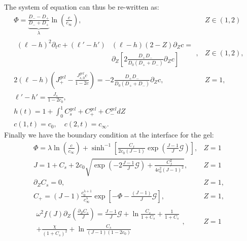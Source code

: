 \documentclass[12pt]{extarticle}
\begin{document}
The system of equation can thus be re-written as:
\begin{eqnarray}
\Phi = \underbrace{\frac{D_--D_+}{D_-+D_+}}_{\lambda} \ln\left(\frac{c}{c_\infty}\right), &Z\in\left(1,2\right)&\\[2mm]
\begin{aligned}
(\ell-h)^2\partial_t c + (\ell'-h')& (\ell-h)(2-Z)\partial_Z c=\\ &\partial_Z\left[2\frac{D_+D_-}{D_0(D_++D_-)}  \partial_Z c\right]
\end{aligned}, &Z\in\left(1,2\right),&\\
2(\ell-h)\left(J^{gel}_+-\frac{J_{s,0}^{gel}c}{1-2c}\right) =- 2 \frac{D_+D_-}{D_0(D_++D_-)}\partial_Z c, & Z=1,&\\
\ell'-h'=\frac{J_s}{1-2c_0},\\
h(t)=1+\int_0^1{C^{gel}_s+C^{gel}_++C^{gel}_-}dZ\\
c(1,t)=c_0, \quad c(2,t)=c_\infty.
\end{eqnarray}
Finally we have the boundary condition at the interface for the gel:
\begin{eqnarray}
\Phi= \lambda \ln \left(\frac{c}{c_\infty}\right)+\sinh^{-1}\left[\frac{C_f}{2c_0 (J-1)}\exp\left(\frac{J-1}{J}\mathcal{G}\right)\right], & Z=1&\\
J=1+C_{s}+ 2c_0\sqrt{\exp\left(-2\frac{J-1}{J}\mathcal{G}\right)+\frac{C^2_f}{4c^2_0 (J-1)^2}}, & Z=1&\\[4mm]
\partial_Z C_{s}=0,&  Z=1,&\\[5mm]
C_{+} = (J-1)\frac{c_0^{\lambda+1}}{c_\infty^{\lambda}}\exp\left[-\Phi-\frac{(J-1)}{J}\mathcal{G}\right], &Z=1,&\\
\begin{aligned}
\omega^2 f(J)\partial_{Z}\left(\frac{\partial_Z C_s}{J}\right)= \frac{J-1}{J} \mathcal{G}  + \ln \frac{C_s}{1+C_{s}} + \frac{1}{1+C_s}\\+\frac{\chi}{(1+C_{s})^2} + \ln \frac{C_s}{(J-1)(1-2c_0)}
\end{aligned}, & Z=1&
\end{eqnarray}
\end{document}
